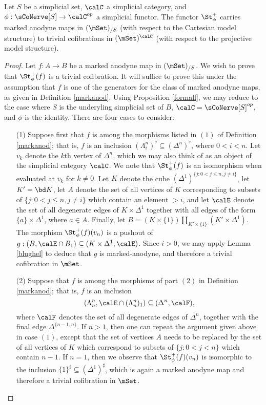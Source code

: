 \begin{proposition}\label{spec2}
Let $S$ be a simplicial set, $\calC$ a simplicial category, and $\phi: \sCoNerve[S] \rightarrow \calC^{op}$ a simplicial functor. The functor $\St^{+}_{\phi}$ carries marked anodyne maps in $(\mSet)_{/S}$ (with respect to the Cartesian model structure) to trivial cofibrations in 
$(\mSet)^{\calC}$ (with respect to the projective model structure).
\end{proposition}

\begin{proof}
Let $f: A \rightarrow B$ be a marked anodyne map in $(\mSet)_{/S}$. We wish to prove that
$\St^{+}_{\phi}(f)$ is a trivial cofibration. It will suffice to prove this under the assumption that $f$ is one of the generators for the class of marked anodyne maps, as given in Definition \ref{markanod}.
Using Proposition \ref{formall}, we may reduce to the case where $S$ is the underyling simplicial set of $B$, $\calC = \sCoNerve[S]^{op}$, and $\phi$ is the identity. There are four cases to consider:

\begin{itemize}
\item[(1)]  Suppose first that $f$ is among the morphisms listed in $(1)$ of Definition \ref{markanod}; that is, $f$ is an inclusion $(\Lambda^n_i)^{\flat} \subseteq (\Delta^n)^{\flat}$, where $0 < i < n$. Let $v_k$ denote the $k$th vertex of $\Delta^n$, which we may also think of as an object of the simplicial category $\calC$. 
We note that $\St^{+}_{\phi}(f)$ is an isomorphism when evaluated at $v_k$ for $k \neq 0$. Let $K$ denote the cube $(\Delta^1)^{ \{ j: 0 < j \leq n, j \neq i \} }$, let $K' = \bd K$, let $A$ denote the set of all vertices of $K$ corresponding to subsets of $\{ j: 0 < j \leq n, j \neq i\}$ which contain an element $> i$, and let
$\calE$ denote the set of all degenerate edges of $K \times \Delta^1$ together with all edges of the form
$\{a\} \times \Delta^1$, where $a \in A$. Finally, let $B = (K \times \{1\} ) \coprod_{ K' \times \{1\} } (K' \times \Delta^1)$. The morphism
$\St^{+}_{\phi}(f)(v_n)$ is a pushout of $g: (B, \calE \cap B_1) \subseteq (K \times \Delta^1, \calE)$. 
Since $i > 0$, we may apply Lemma \ref{blughel} to deduce that $g$ is marked-anodyne, and therefore a trivial cofibration in $\mSet$.

\item[(2)]
Suppose that $f$ is among the morphisms of part $(2)$ in Definition \ref{markanod}; that is, $f$
is an inclusion $$( \Lambda^n_n, \calE \cap (\Lambda^n_n)_{1} ) \subseteq ( \Delta^n, \calF ),$$
where $\calF$ denotes the set of all degenerate edges of $\Delta^n$, together with the final edge $\Delta^{ \{n-1,n\} }$. If $n > 1$, then one can repeat the argument given above in case $(1)$, except that the set of vertices $A$ needs to be replaced by the set of all vertices of $K$ which correspond to subsets of $\{j: 0 < j < n\}$ which contain $n-1$. If $n=1$, then we observe that $\St^{+}_{\phi}(f)(v_n)$ is
isomorphic to the inclusion $\{1\}^{\sharp} \subseteq (\Delta^1)^{\sharp}$, which is again a marked anodyne map and therefore a trivial cofibration in $\mSet$.


\end{itemize}
\end{proof}
